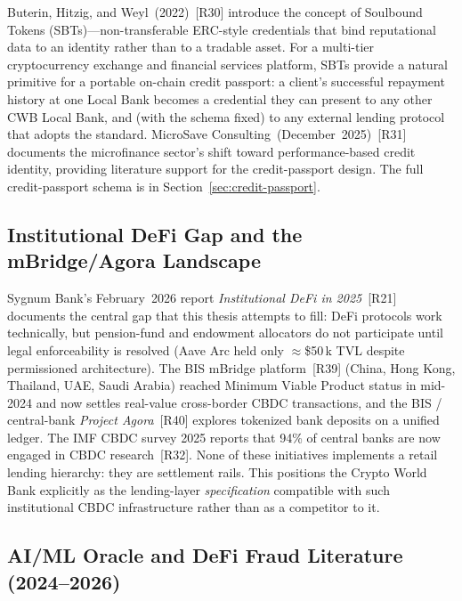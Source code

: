 \documentclass[12pt,a4paper]{report}
\begin{document}
Buterin, Hitzig, and Weyl~(2022)~[R30] introduce the concept of Soulbound Tokens (SBTs)---non-transferable ERC-style credentials that bind reputational data to an identity rather than to a tradable asset. For a multi-tier cryptocurrency exchange and financial services platform, SBTs provide a natural primitive for a portable on-chain credit passport: a client's successful repayment history at one Local Bank becomes a credential they can present to any other CWB Local Bank, and (with the schema fixed) to any external lending protocol that adopts the standard. MicroSave Consulting~(December~2025)~[R31] documents the microfinance sector's shift toward performance-based credit identity, providing literature support for the credit-passport design. The full credit-passport schema is in Section~\ref{sec:credit-passport}.

\subsection{Institutional DeFi Gap and the mBridge/Agora Landscape}
\label{sec:lit-institutional}

Sygnum Bank's February~2026 report \textit{Institutional DeFi in 2025}~[R21] documents the central gap that this thesis attempts to fill: DeFi protocols work technically, but pension-fund and endowment allocators do not participate until legal enforceability is resolved (Aave Arc held only $\approx$\$50\,k TVL despite permissioned architecture). The BIS mBridge platform~[R39] (China, Hong Kong, Thailand, UAE, Saudi Arabia) reached Minimum Viable Product status in mid-2024 and now settles real-value cross-border CBDC transactions, and the BIS / central-bank \textit{Project Agora}~[R40] explores tokenized bank deposits on a unified ledger. The IMF CBDC survey 2025 reports that 94\% of central banks are now engaged in CBDC research~[R32]. None of these initiatives implements a retail lending hierarchy: they are settlement rails. This positions the Crypto World Bank explicitly as the lending-layer \textit{specification} compatible with such institutional CBDC infrastructure rather than as a competitor to it.

\subsection{AI/ML Oracle and DeFi Fraud Literature (2024--2026)}
\label{sec:lit-ml-oracle}
\end{document}
